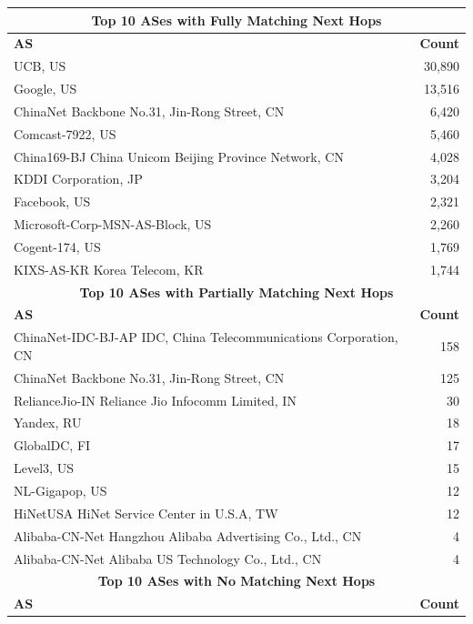 \documentclass[12pt]{cwru_thesis}
\begin{document}
\begin{table}[h!]
    \centering
    \begin{tabular}{|l|r|}
        \hline
        \multicolumn{2}{|c|}{\textbf{Top 10 ASes with Fully Matching Next Hops}} \\
        \hline
        \textbf{AS} & \textbf{Count} \\
        \hline
        UCB, US & 30,890 \\
        Google, US & 13,516 \\
        ChinaNet Backbone No.31, Jin-Rong Street, CN & 6,420 \\
        Comcast-7922, US & 5,460 \\
        China169-BJ China Unicom Beijing Province Network, CN & 4,028 \\
        KDDI Corporation, JP & 3,204 \\
        Facebook, US & 2,321 \\
        Microsoft-Corp-MSN-AS-Block, US & 2,260 \\
        Cogent-174, US & 1,769 \\
        KIXS-AS-KR Korea Telecom, KR & 1,744 \\
        \hline
        \multicolumn{2}{|c|}{\textbf{Top 10 ASes with Partially Matching Next Hops}} \\
        \hline
        \textbf{AS} & \textbf{Count} \\
        \hline
        ChinaNet-IDC-BJ-AP IDC, China Telecommunications Corporation, CN & 158 \\
        ChinaNet Backbone No.31, Jin-Rong Street, CN & 125 \\
        RelianceJio-IN Reliance Jio Infocomm Limited, IN & 30 \\
        Yandex, RU & 18 \\
        GlobalDC, FI & 17 \\
        Level3, US & 15 \\
        NL-Gigapop, US & 12 \\
        HiNetUSA HiNet Service Center in U.S.A, TW & 12 \\
        Alibaba-CN-Net Hangzhou Alibaba Advertising Co., Ltd., CN & 4 \\
        Alibaba-CN-Net Alibaba US Technology Co., Ltd., CN & 4 \\
        \hline
        \multicolumn{2}{|c|}{\textbf{Top 10 ASes with No Matching Next Hops}} \\
        \hline
        \textbf{AS} & \textbf{Count} \\

\end{tabular}
\end{table}
\end{document}

